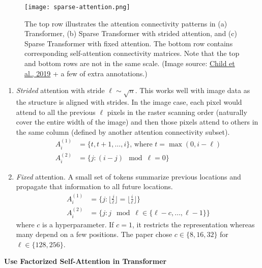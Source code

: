 \documentclass[12pt]{article}
\begin{document}
\begin{figure}[h!]
    \centering
    \texttt{[image: sparse-attention.png]}
    \caption{The top row illustrates the attention connectivity patterns in (a) Transformer, (b) Sparse Transformer with strided attention, and (c) Sparse Transformer with fixed attention. The bottom row contains corresponding self-attention connectivity matrices. Note that the top and bottom rows are not in the same scale. (Image source: \href{https://arxiv.org/abs/1904.10509}{Child et al., 2019} + a few of extra annotations.)}
\end{figure}

\begin{enumerate}
    \item \emph{Strided} attention with stride $\ell \sim \sqrt{n}$. This works well with image data as the structure is aligned with strides. In the image case, each pixel would attend to all the previous $\ell$ pixels in the raster scanning order (naturally cover the entire width of the image) and then those pixels attend to others in the same column (defined by another attention connectivity subset).
    \[
    \begin{aligned}
    A_i^{(1)} &= \{ t, t+1, \dots, i\} \text{, where } t = \max(0, i - \ell) \\
    A_i^{(2)} &= \{j: (i-j) \mod \ell = 0\}
    \end{aligned}
    \]
    \item \emph{Fixed} attention. A small set of tokens summarize previous locations and propagate that information to all future locations.
    \[
    \begin{aligned}
    A_i^{(1)} &= \{j: \lfloor \frac{j}{\ell} \rfloor = \lfloor \frac{i}{\ell} \rfloor \} \\
    A_i^{(2)} &= \{j: j \mod \ell \in \{\ell-c, \dots, \ell-1\} \}
    \end{aligned}
    \]
    where $c$ is a hyperparameter. If $c=1$, it restricts the representation whereas many depend on a few positions. The paper chose $c\in \{ 8, 16, 32 \}$ for $\ell \in \{ 128, 256 \}$.
\end{enumerate}

\textbf{Use Factorized Self-Attention in Transformer}
\end{document}
